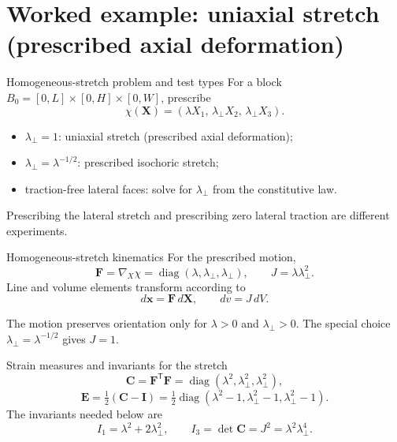 \documentclass[aspectratio=169,11pt]{beamer}
\newcommand{\xvec}{\bm{x}}
\newcommand{\Xvec}{\bm{X}}
\newcommand{\Ften}{\bm{F}}
\newcommand{\Cten}{\bm{C}}
\newcommand{\Eten}{\bm{E}}
\newcommand{\Identity}{\bm{I}}
\newcommand{\Grad}{\nabla_{\!X}}
\begin{document}
\section{Worked example: uniaxial stretch (prescribed axial deformation)}

\begin{frame}{Homogeneous-stretch problem and test types}
For a block \(B_0=[0,L]\times[0,H]\times[0,W]\), prescribe
\[
  \chi(\Xvec)
  =
  \left(
  \lambda X_1,\,
  \lambda_{\perp}X_2,\,
  \lambda_{\perp}X_3
  \right).
\]
\begin{itemize}\itemsep6pt
  \item \(\lambda_\perp=1\): uniaxial stretch (prescribed axial deformation);
  \item \(\lambda_\perp=\lambda^{-1/2}\): prescribed isochoric stretch;
  \item traction-free lateral faces: solve for \(\lambda_\perp\) from the constitutive law.
\end{itemize}
\medskip
\begin{punchbox}
\small Prescribing the lateral stretch and prescribing zero lateral traction are different experiments.
\end{punchbox}
\end{frame}

\begin{frame}{Homogeneous-stretch kinematics}
For the prescribed motion,
\[
  \Ften=\Grad\chi
  =\operatorname{diag}(\lambda,\lambda_\perp,\lambda_\perp),
  \qquad
  J=\lambda\lambda_\perp^2.
\]
Line and volume elements transform according to
\[
  d\xvec=\Ften\,d\Xvec,
  \qquad
  dv=J\,dV.
\]
\begin{punchbox}
\small The motion preserves orientation only for \(\lambda>0\) and \(\lambda_\perp>0\). The special choice \(\lambda_\perp=\lambda^{-1/2}\) gives \(J=1\).
\end{punchbox}
\end{frame}

\begin{frame}{Strain measures and invariants for the stretch}
\[
  \Cten=\Ften^{\mathsf T}\Ften
  =\operatorname{diag}
  (\lambda^2,\lambda_\perp^2,\lambda_\perp^2),
\]
\[
  \Eten=\tfrac12(\Cten-\Identity)
  =\tfrac12\operatorname{diag}
  (\lambda^2-1,\lambda_\perp^2-1,\lambda_\perp^2-1).
\]
The invariants needed below are
\[
  I_1=\lambda^2+2\lambda_\perp^2,
  \qquad
  I_3=\det\Cten=J^2=\lambda^2\lambda_\perp^4.
\]
\end{frame}
\end{document}
